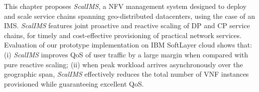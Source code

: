 This chapter proposes \textit{ScalIMS}, a NFV management system designed to deploy and scale service chains spanning geo-distributed datacenters, using the case of an IMS. \textit{ScalIMS} features joint proactive and reactive scaling of DP and CP service chains, for timely and cost-effective provisioning of practical network services. Evaluation of our prototype implementation on IBM SoftLayer cloud shows that: (i) \textit{ScalIMS} improves QoS of user traffic by a large margin when compared with pure reactive scaling; (ii) when peak workload arrives asynchronously over the geographic span, \textit{ScalIMS} effectively reduces the total number of VNF instances provisioned while guaranteeing excellent QoS. %

